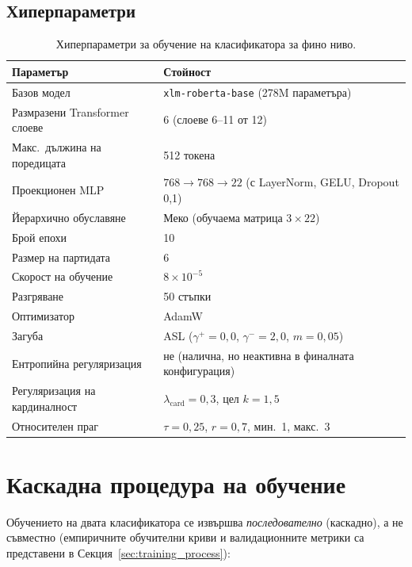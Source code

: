 \documentclass[12pt,a4paper]{report}
\begin{document}
\subsection{Хиперпараметри}

\begin{table}[H]
\centering
\caption{Хиперпараметри за обучение на класификатора за фино ниво.}
\label{tab:fine_hyperparams}
\begin{tabular}{ll}
\toprule
\textbf{Параметър} & \textbf{Стойност} \\
\midrule
Базов модел & \texttt{xlm-roberta-base} (278M параметъра) \\
Размразени Transformer слоеве & 6 (слоеве 6--11 от 12) \\
Макс.\ дължина на поредицата & 512 токена \\
Проекционен MLP & $768 \to 768 \to 22$ (с LayerNorm, GELU, Dropout 0,1) \\
Йерархично обуславяне & Меко (обучаема матрица $3 \times 22$) \\
\midrule
Брой епохи & 10 \\
Размер на партидата & 6 \\
Скорост на обучение & $8 \times 10^{-5}$ \\
Разгряване & 50 стъпки \\
Оптимизатор & AdamW \cite{loshchilov2019adamw} \\
\midrule
Загуба & ASL ($\gamma^+=0{,}0$, $\gamma^-=2{,}0$, $m=0{,}05$) \\
Ентропийна регуляризация & не (налична, но неактивна в финалната конфигурация) \\
Регуляризация на кардиналност & $\lambda_{\text{card}}=0{,}3$, цел $k=1{,}5$ \\
\midrule
Относителен праг & $\tau=0{,}25$, $r=0{,}7$, мин.\ 1, макс.\ 3 \\
\bottomrule
\end{tabular}
\end{table}


\section{Каскадна процедура на обучение}
\label{sec:training_procedure}

Обучението на двата класификатора се извършва \textit{последователно} (каскадно), а не съвместно (емпиричните обучителни криви и валидационните метрики са представени в Секция~\ref{sec:training_process}):
\end{document}
